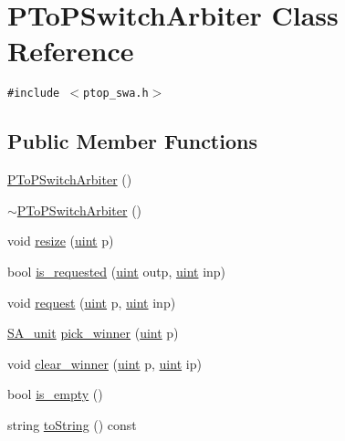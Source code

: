 \hypertarget{classPToPSwitchArbiter}{
\section{PToPSwitchArbiter Class Reference}
\label{classPToPSwitchArbiter}
}
{\tt \#include $<$ptop\_\-swa.h$>$}

\subsection*{Public Member Functions}
\begin{CompactItemize}
\item 
\hyperlink{classPToPSwitchArbiter_dc9c6f383f3f135ca2fa003380b52021}{PToPSwitchArbiter} ()
\item 
\hyperlink{classPToPSwitchArbiter_f59e4ed8cfb944b1ca266cdfc413b078}{$\sim$PToPSwitchArbiter} ()
\item 
void \hyperlink{classPToPSwitchArbiter_73fb7254a91aeeb209fa3225f09b1847}{resize} (\hyperlink{outputBuffer_8h_91ad9478d81a7aaf2593e8d9c3d06a14}{uint} p)
\item 
bool \hyperlink{classPToPSwitchArbiter_3c4eeb723ecb521a82a4518820e48896}{is\_\-requested} (\hyperlink{outputBuffer_8h_91ad9478d81a7aaf2593e8d9c3d06a14}{uint} outp, \hyperlink{outputBuffer_8h_91ad9478d81a7aaf2593e8d9c3d06a14}{uint} inp)
\item 
void \hyperlink{classPToPSwitchArbiter_34e8394265869ee076610c67e4cf5de7}{request} (\hyperlink{outputBuffer_8h_91ad9478d81a7aaf2593e8d9c3d06a14}{uint} p, \hyperlink{outputBuffer_8h_91ad9478d81a7aaf2593e8d9c3d06a14}{uint} inp)
\item 
\hyperlink{classSA__unit}{SA\_\-unit} \hyperlink{classPToPSwitchArbiter_8b304c2fc07b6c0d55ce25b621a9f685}{pick\_\-winner} (\hyperlink{outputBuffer_8h_91ad9478d81a7aaf2593e8d9c3d06a14}{uint} p)
\item 
void \hyperlink{classPToPSwitchArbiter_752c022c63e6552d06798d65e634f8d4}{clear\_\-winner} (\hyperlink{outputBuffer_8h_91ad9478d81a7aaf2593e8d9c3d06a14}{uint} p, \hyperlink{outputBuffer_8h_91ad9478d81a7aaf2593e8d9c3d06a14}{uint} ip)
\item 
bool \hyperlink{classPToPSwitchArbiter_20a229615b20e987aaa0291af0805e31}{is\_\-empty} ()
\item 
string \hyperlink{classPToPSwitchArbiter_f85a552b1be155e2717c197a51799414}{toString} () const 
\end{CompactItemize}
